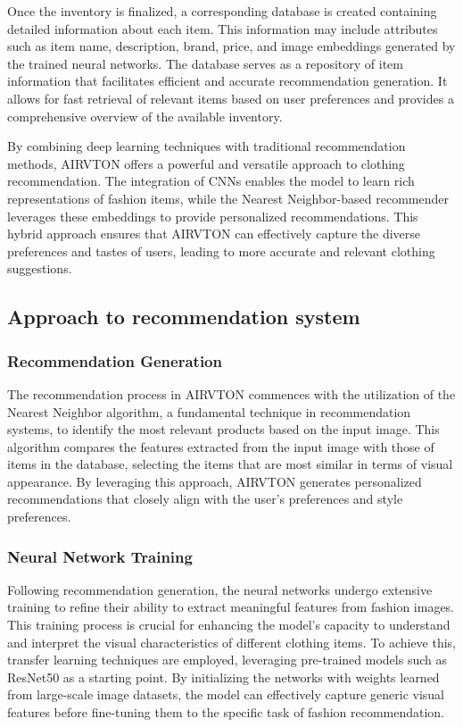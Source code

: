         Once the inventory is finalized, a corresponding database is created containing detailed information about each item. This information may include attributes such as item name, description, brand, price, and image embeddings generated by the trained neural networks. The database serves as a repository of item information that facilitates efficient and accurate recommendation generation. It allows for fast retrieval of relevant items based on user preferences and provides a comprehensive overview of the available inventory.

        By combining deep learning techniques with traditional recommendation methods, AIRVTON offers a powerful and versatile approach to clothing recommendation. The integration of CNNs enables the model to learn rich representations of fashion items, while the Nearest Neighbor-based recommender leverages these embeddings to provide personalized recommendations. This hybrid approach ensures that AIRVTON can effectively capture the diverse preferences and tastes of users, leading to more accurate and relevant clothing suggestions.

    \subsection{Approach to recommendation system}

	\subsubsection{Recommendation Generation}

    The recommendation process in AIRVTON commences with the utilization of the Nearest Neighbor algorithm, a fundamental technique in recommendation systems, to identify the most relevant products based on the input image. This algorithm compares the features extracted from the input image with those of items in the database, selecting the items that are most similar in terms of visual appearance. By leveraging this approach, AIRVTON generates personalized recommendations that closely align with the user's preferences and style preferences.

    \subsubsection{Neural Network Training}

    Following recommendation generation, the neural networks undergo extensive training to refine their ability to extract meaningful features from fashion images. This training process is crucial for enhancing the model's capacity to understand and interpret the visual characteristics of different clothing items. To achieve this, transfer learning techniques are employed, leveraging pre-trained models such as ResNet50 as a starting point. By initializing the networks with weights learned from large-scale image datasets, the model can effectively capture generic visual features before fine-tuning them to the specific task of fashion recommendation.


